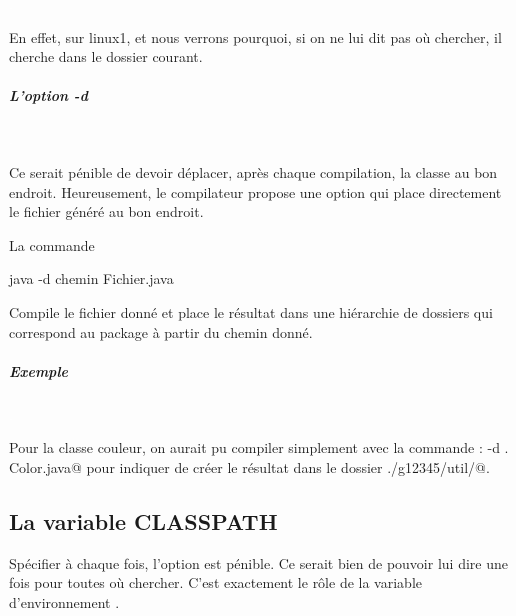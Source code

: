 \documentclass[11pt,a4paper]{article}
\begin{document}
					\textcolor{white}{.} \par
				
            \par
        
			En effet, sur linux1, et nous verrons pourquoi,
			si on ne lui  dit pas o\`u chercher, 
			il cherche dans le dossier courant.
		
            \par
        
			
		\subparagraph{L'option -d} 
		
					\textcolor{white}{.} \par
				
            \par
        
			Ce serait p\'enible de devoir d\'eplacer,
			apr\`es chaque compilation,
			la classe au bon endroit.
			Heureusement, le compilateur propose une option
			qui place directement le fichier g\'en\'er\'e au bon endroit.
		
            \par
        
			La commande
		
            \par
        \begin{Java}
	java -d chemin Fichier.java
		\end{Java}
			Compile le fichier donn\'e et place
			le r\'esultat dans une hi\'erarchie de dossiers
			qui correspond au package \`a partir du chemin donn\'e.
		
            \par
        
			
		\subparagraph{Exemple} 
		
					\textcolor{white}{.} \par
				
			Pour la classe couleur, 
			on aurait pu compiler simplement avec la commande :
			\verb@javac -d . Color.java@
			pour indiquer de cr\'eer le r\'esultat dans le dossier
			\verb@./g12345/util/@.
		
            \par
        \subsection{La variable CLASSPATH}
				Sp\'ecifier \`a chaque fois,
				l'option \verb@cp@
				est p\'enible.
				Ce serait bien de pouvoir lui dire une fois pour toutes
				o\`u chercher.
				C'est exactement le r\^ole de la variable d'environnement
				\verb@CLASSPATH@.
			
\end{document}
